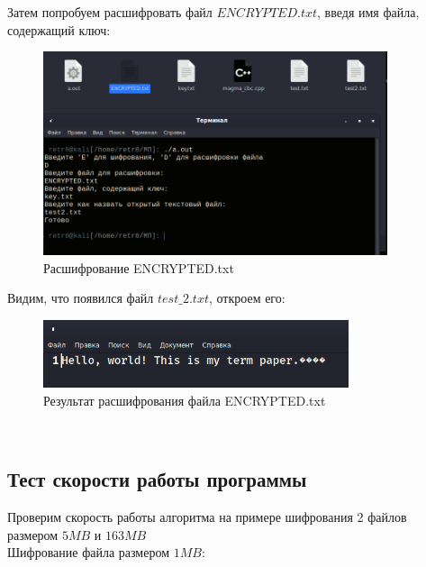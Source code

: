 \documentclass[oneside,final,14pt]{extreport}
\begin{document}
Затем попробуем расшифровать файл $ENCRYPTED.txt$, введя имя файла, содержащий ключ:\\

\begin{figure}[h!]
\includegraphics[width=0.9\textwidth]{22.png}
\caption{Расшифрование ENCRYPTED.txt }
\end{figure}


Видим, что появился файл $test\_2.txt$, откроем его:\\

\begin{figure}[h!]
\includegraphics[width=0.8\textwidth]{23.png}
\caption{Результат расшифрования файла ENCRYPTED.txt }

\end{figure}



~\


\subsection{Тест скорости работы программы}

Проверим скорость работы алгоритма на примере шифрования 2 файлов размером $5MB$ и  $163MB$\\


Шифрование файла размером $1MB$:\\
\end{document}
